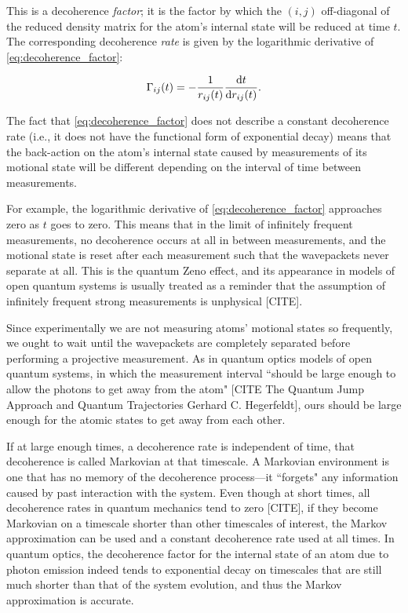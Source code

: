 This is a decoherence \emph{factor}; it is the factor by which the $(i, j)$ off-diagonal of the reduced density matrix for the atom's internal state will be reduced at time $t$. The corresponding decoherence \emph{rate} is given by the logarithmic derivative of \eqref{eq:decoherence_factor}:

\begin{align}
\Gamma_{ij}(t) = - \frac 1 {r_{ij}(t)} \dv t {r_{ij}(t)}.
\end{align}

 The fact that \eqref{eq:decoherence_factor} does not describe a constant decoherence rate (i.e., it does not have the functional form of exponential decay) means that the back-action on the atom's internal state caused by measurements of its motional state will be different depending on the interval of time between measurements.

For example, the logarithmic derivative of \eqref{eq:decoherence_factor} approaches zero as $t$ goes to zero. This means that in the limit of infinitely frequent measurements, no decoherence occurs at all in between measurements, and the motional state is reset after each measurement such that the wavepackets never separate at all. This is the quantum Zeno effect, and its appearance in models of open quantum systems is usually treated as a reminder that the assumption of infinitely frequent strong measurements is unphysical [CITE].

Since experimentally we are not measuring atoms' motional states so frequently, we ought to wait until the wavepackets are completely separated before performing a projective measurement. As in quantum optics models of open quantum systems, in which the measurement interval ``should be large enough to allow the photons to get away from the atom" [CITE The Quantum Jump Approach
and Quantum Trajectories Gerhard C. Hegerfeldt], ours should be large enough for the atomic states to get away from each other.

If at large enough times, a decoherence rate is independent of time, that decoherence is called Markovian at that timescale. A Markovian environment is one that has no memory of the decoherence process---it ``forgets" any information caused by past interaction with the system. Even though at short times, all decoherence rates in quantum mechanics tend to zero [CITE], if they become Markovian on a timescale shorter than other timescales of interest, the Markov approximation can be used and a constant decoherence rate used at all times. In quantum optics, the decoherence factor for the internal state of an atom due to photon emission indeed tends to exponential decay on timescales that are still much shorter than that of the system evolution, and thus the Markov approximation is accurate.

